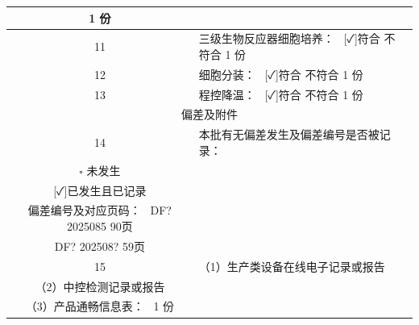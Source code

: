 \documentclass[UTF8,10pt,a4paper,fontset=fandol]{ctexart}
\newcommand{\fieldvalue}[1]{#1}
\newcommand{\handwritten}[1]{#1}
\begin{document}
\begin{tabularx}{\textwidth}{|c|X|l|}
\fieldvalue{\handwritten{1}} 份 &
\\
\hline
11 & 三级生物反应器细胞培养：\ 
\fieldvalue{[✓]符合 \quad [ ]不符合}
\quad
\fieldvalue{\handwritten{1}} 份 &
\\
\hline
12 & 细胞分装：\ 
\fieldvalue{[✓]符合 \quad [ ]不符合}
\quad
\fieldvalue{\handwritten{1}} 份 &
\\
\hline
13 & 程控降温：\ 
\fieldvalue{[✓]符合 \quad [ ]不符合}
\quad
\fieldvalue{\handwritten{1}} 份 &
\\
\hline
\multicolumn{3}{|c|}{偏差及附件} \\
\hline
14 &
本批有无偏差发生及偏差编号是否被记录：\\
\quad $\square$ 未发生\\
\quad
\fieldvalue{[✓]已发生且已记录}\\
偏差编号及对应页码：\ 
\fieldvalue{\handwritten{DF? 2025085}}
\quad
\fieldvalue{\handwritten{90页}}\\
\quad
\fieldvalue{\handwritten{DF? 202508?}}
\quad
\fieldvalue{\handwritten{59页}}
&
\\
\hline
15 &
（1）生产类设备在线电子记录或报告\\
（2）中控检测记录或报告\\
（3）产品通畅信息表：\ 
\fieldvalue{\handwritten{1}} 份 &
\\
\hline
\end{tabularx}
\normalsize

\end{document}
